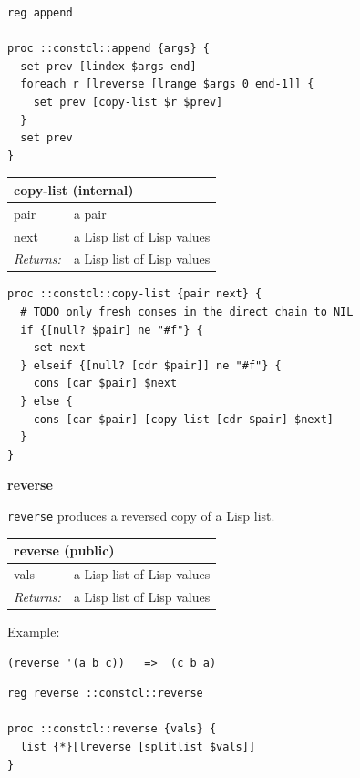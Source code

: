 \documentclass[twoside,9pt]{report}
\begin{document}
\noindent\makebox[\linewidth]{\rule{\linewidth}{0.4pt}}
\begin{lstlisting}
reg append
 
proc ::constcl::append {args} {
  set prev [lindex $args end]
  foreach r [lreverse [lrange $args 0 end-1]] {
    set prev [copy-list $r $prev]
  }
  set prev
}
\end{lstlisting}
\noindent\makebox[\linewidth]{\rule{\linewidth}{0.4pt}}
\begin{tabular}{ |l l| }
\hline
\multicolumn{2}{|l|}{copy-list (internal)} \\
\hline
pair & a pair \\
next & a Lisp list of Lisp values \\
\textit{Returns:} & a Lisp list of Lisp values \\
\hline
\end{tabular}

\noindent\makebox[\linewidth]{\rule{\linewidth}{0.4pt}}
\begin{lstlisting}
proc ::constcl::copy-list {pair next} {
  # TODO only fresh conses in the direct chain to NIL
  if {[null? $pair] ne "#f"} {
    set next
  } elseif {[null? [cdr $pair]] ne "#f"} {
    cons [car $pair] $next
  } else {
    cons [car $pair] [copy-list [cdr $pair] $next]
  }
}
\end{lstlisting}
\noindent\makebox[\linewidth]{\rule{\linewidth}{0.4pt}}

\textbf{reverse}


\texttt{reverse} produces a reversed copy of a Lisp list.

\begin{tabular}{ |l l| }
\hline
\multicolumn{2}{|l|}{reverse (public)} \\
\hline
vals & a Lisp list of Lisp values \\
\textit{Returns:} & a Lisp list of Lisp values \\
\hline
\end{tabular}


Example:

\noindent\makebox[\linewidth]{\rule{\linewidth}{0.4pt}}
\begin{lstlisting}
(reverse '(a b c))   =>  (c b a)
\end{lstlisting}
\noindent\makebox[\linewidth]{\rule{\linewidth}{0.4pt}}
\noindent\makebox[\linewidth]{\rule{\linewidth}{0.4pt}}
\begin{lstlisting}
reg reverse ::constcl::reverse
 
proc ::constcl::reverse {vals} {
  list {*}[lreverse [splitlist $vals]]
}
\end{lstlisting}
\noindent\makebox[\linewidth]{\rule{\linewidth}{0.4pt}}
\end{document}
